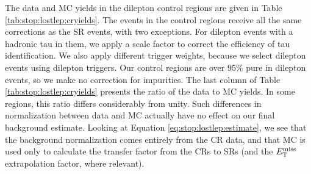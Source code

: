The data and MC yields in the dilepton control regions are given in
Table \ref{tab:stop:lostlep:cryields}. The events in the control
regions receive all the same corrections as the SR
events, with two exceptions. For dilepton events with a hadronic tau
in them, we apply a scale factor to correct the efficiency of tau
identification. We also apply different trigger weights, because we
select dilepton events using dilepton triggers.
Our control regions are over 95\% pure in dilepton events,
so we make no correction for impurities. The last column of Table
\ref{tab:stop:lostlep:cryields} presents the ratio of the data to MC
yields. In some regions, this ratio differs considerably from
unity. Such differences in normalization between data and MC
actually have no effect on our final background estimate. Looking at Equation
\ref{eq:stop:lostlep:estimate}, we see that the background
normalization comes entirely from the CR data, and that MC is used
only to calculate the transfer factor from the CRs to SRs (and the
$E_\text{T}^\text{miss}$ extrapolation factor, where relevant).

